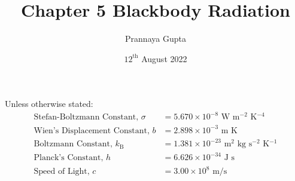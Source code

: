 \documentclass[a4paper, 12pt, addpoints]{exam}
\title{Chapter 5 \textbf{Blackbody Radiation}}
\author{Prannaya Gupta}
\date{$12^{\text{th}}$ August 2022}
\begin{document}
\maketitle


\begin{tcolorbox}
Unless otherwise stated:
\begin{align*}
\text{Stefan-Boltzmann Constant, }\sigma &= 5.670 \times 10^{-8}\text{ W m${}^{-2}$ K${}^{-4}$} \\
\text{Wien's Displacement Constant, }b &= 2.898 \times 10^{-3} \text{ m K} \\
\text{Boltzmann Constant, }k_\text{B} &= 1.381 \times 10^{-23}\text{ m${}^2$ kg s${}^{-2}$ K${}^{-1}$} \\
\text{Planck's Constant, }h &= 6.626 \times 10^{-34}\text{ J s} \\
\text{Speed of Light, }c &= 3.00 \times 10^8 \text{ m/s}
\end{align*}
\end{tcolorbox}
\newpage
\end{document}

